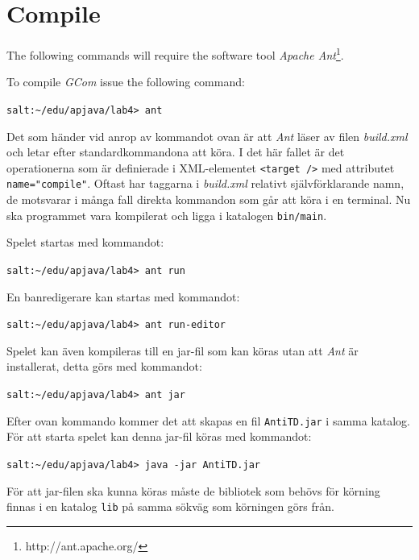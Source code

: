 \documentclass[titlepage, twocolumn, a4paper, 10pt]{article}
\begin{document}
\section{Compile}\label{sec:compile}
The following commands will require the software tool \textit{Apache
  Ant}\footnote{http://ant.apache.org/}.

To compile \textit{GCom} issue the following command:\\
\begin{footnotesize}
  \verb!salt:~/edu/apjava/lab4> ant!
\end{footnotesize}

Det som händer vid anrop av kommandot ovan är att \textit{Ant} läser
av filen \textit{build.xml} och letar efter standardkommandona att
köra. I det här fallet är det operationerna som är definierade i
XML-elementet \verb!<target />! med attributet
\verb!name="compile"!. Oftast har taggarna i \textit{build.xml}
relativt självförklarande namn, de motsvarar i många fall direkta
kommandon som går att köra i en terminal. Nu ska programmet vara
kompilerat och ligga i katalogen \verb!bin/main!.

Spelet startas med kommandot:\\
\begin{footnotesize}
  \verb!salt:~/edu/apjava/lab4> ant run!
\end{footnotesize}

En banredigerare kan startas med kommandot:\\
\begin{footnotesize}
  \verb!salt:~/edu/apjava/lab4> ant run-editor!
\end{footnotesize}

Spelet kan även kompileras till en jar-fil som kan köras utan att
\textit{Ant} är installerat, detta görs med kommandot:\\
\begin{footnotesize}
  \verb!salt:~/edu/apjava/lab4> ant jar!
\end{footnotesize}

Efter ovan kommando kommer det att skapas en fil \verb!AntiTD.jar! i
samma katalog. För att starta spelet kan denna jar-fil köras med
kommandot:\\
\begin{footnotesize}
  \verb!salt:~/edu/apjava/lab4> java -jar AntiTD.jar!
\end{footnotesize}

För att jar-filen ska kunna köras måste de bibliotek som behövs för
körning finnas i en katalog \verb!lib! på samma sökväg som körningen
görs från.
\end{document}
